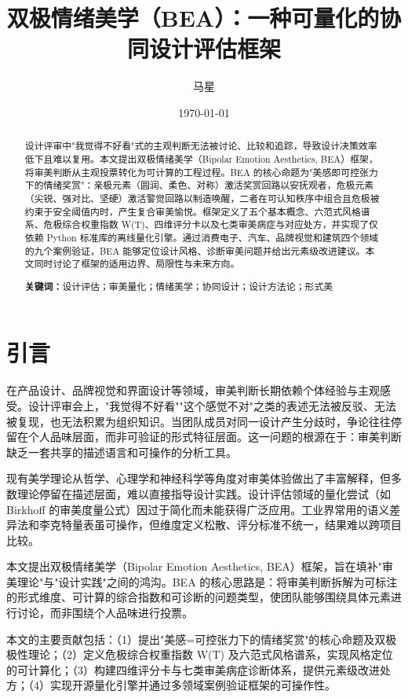 \documentclass[10pt,a4paper]{article}
\title{\textbf{双极情绪美学（BEA）：一种可量化的协同设计评估框架}}
\author{马星}
\date{\today}
\begin{document}
\maketitle

\begin{abstract}
设计评审中"我觉得不好看"式的主观判断无法被讨论、比较和追踪，导致设计决策效率低下且难以复用。本文提出双极情绪美学（Bipolar Emotion Aesthetics, BEA）框架，将审美判断从主观投票转化为可计算的工程过程。BEA 的核心命题为"美感即可控张力下的情绪奖赏"：亲极元素（圆润、柔色、对称）激活奖赏回路以安抚观者，危极元素（尖锐、强对比、坚硬）激活警觉回路以制造唤醒，二者在可认知秩序中组合且危极被约束于安全阈值内时，产生复合审美愉悦。框架定义了五个基本概念、六范式风格谱系、危极综合权重指数 W(T)、四维评分卡以及七类审美病症与对应处方，并实现了仅依赖 Python 标准库的离线量化引擎。通过消费电子、汽车、品牌视觉和建筑四个领域的九个案例验证，BEA 能够定位设计风格、诊断审美问题并给出元素级改进建议。本文同时讨论了框架的适用边界、局限性与未来方向。

\textbf{关键词：}设计评估；审美量化；情绪美学；协同设计；设计方法论；形式美
\end{abstract}

\section{引言}

在产品设计、品牌视觉和界面设计等领域，审美判断长期依赖个体经验与主观感受。设计评审会上，"我觉得不好看""这个感觉不对"之类的表述无法被反驳、无法被复现，也无法积累为组织知识。当团队成员对同一设计产生分歧时，争论往往停留在个人品味层面，而非可验证的形式特征层面。这一问题的根源在于：审美判断缺乏一套共享的描述语言和可操作的分析工具。

现有美学理论从哲学\cite{burke1757,kant1790}、心理学\cite{berlyne1971,arnheim1954}和神经科学\cite{zeki1999,ramachandran1999}等角度对审美体验做出了丰富解释，但多数理论停留在描述层面，难以直接指导设计实践。设计评估领域的量化尝试（如 Birkhoff 的审美度量公式\cite{birkhoff1933}）因过于简化而未能获得广泛应用。工业界常用的语义差异法\cite{osgood1957}和李克特量表虽可操作，但维度定义松散、评分标准不统一，结果难以跨项目比较。

本文提出双极情绪美学（Bipolar Emotion Aesthetics, BEA）框架，旨在填补"审美理论"与"设计实践"之间的鸿沟。BEA 的核心思路是：将审美判断拆解为可标注的形式维度、可计算的综合指数和可诊断的问题类型，使团队能够围绕具体元素进行讨论，而非围绕个人品味进行投票。

本文的主要贡献包括：（1）提出"美感=可控张力下的情绪奖赏"的核心命题及双极极性理论；（2）定义危极综合权重指数 W(T) 及六范式风格谱系，实现风格定位的可计算化；（3）构建四维评分卡与七类审美病症诊断体系，提供元素级改进处方；（4）实现开源量化引擎并通过多领域案例验证框架的可操作性。
\end{document}
